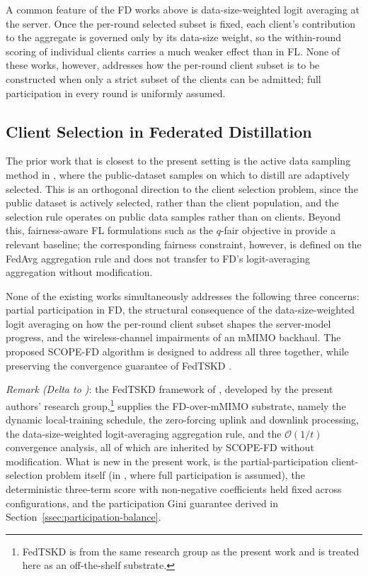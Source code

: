 \documentclass[journal]{IEEEtran}
\begin{document}
A common feature of the FD works above is data-size-weighted logit averaging at the server. Once the per-round selected subset is fixed, each client's contribution to the aggregate is governed only by its data-size weight, so the within-round scoring of individual clients carries a much weaker effect than in FL. None of these works, however, addresses how the per-round client subset is to be constructed when only a strict subset of the clients can be admitted; full participation in every round is uniformly assumed.

\subsection{Client Selection in Federated Distillation}
\label{ssec:rw-fd-selection}

The prior work that is closest to the present setting is the active data sampling method in \cite{liu2022active}, where the public-dataset samples on which to distill are adaptively selected. This is an orthogonal direction to the client selection problem, since the public dataset is actively selected, rather than the client population, and the selection rule operates on public data samples rather than on clients. Beyond this, fairness-aware FL formulations such as the $q$-fair objective in \cite{li2020qffl} provide a relevant baseline; the corresponding fairness constraint, however, is defined on the FedAvg aggregation rule and does not transfer to FD's logit-averaging aggregation without modification.

None of the existing works simultaneously addresses the following three concerns: partial participation in FD, the structural consequence of the data-size-weighted logit averaging on how the per-round client subset shapes the server-model progress, and the wireless-channel impairments of an mMIMO backhaul. The proposed SCOPE-FD algorithm is designed to address all three together, while preserving the convergence guarantee of FedTSKD \cite{mu2024fedtskd}.

\textit{Remark (Delta to \cite{mu2024fedtskd})}: the FedTSKD framework of \cite{mu2024fedtskd}, developed by the present authors' research group,\footnote{FedTSKD \cite{mu2024fedtskd} is from the same research group as the present work and is treated here as an off-the-shelf substrate.} supplies the FD-over-mMIMO substrate, namely the dynamic local-training schedule, the zero-forcing uplink and downlink processing, the data-size-weighted logit-averaging aggregation rule, and the $\mathcal{O}(1/t)$ convergence analysis, all of which are inherited by SCOPE-FD without modification. What is new in the present work, is the partial-participation client-selection problem itself (in \cite{mu2024fedtskd}, where full participation is assumed), the deterministic three-term score with non-negative coefficients held fixed across configurations, and the participation Gini guarantee derived in Section~\ref{ssec:participation-balance}.
\end{document}
